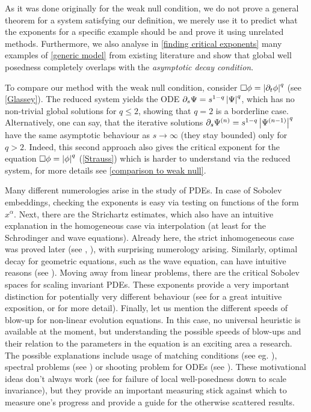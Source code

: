 \documentclass[11pt, oneside]{amsart}
\begin{document}
	As it was done originally for the weak null condition, we do not prove a general  theorem for a system satisfying our definition, we merely use it to predict what the exponents for a specific example should be and prove it using unrelated methods. Furthermore, we also analyse in \cref{finding critical exponents} many examples of \cref{generic model} from existing literature and show that global well posedness completely overlaps with the \textit{asymptotic decay condition}.
	
	To compare our method with the weak null condition, consider $\Box\phi=\left\lvert \partial_t\phi\right\rvert^q$ (see \cref{Glassey}). The reduced system yields the ODE $\partial_s\Psi=s^{1-q}\left\lvert \Psi\right\rvert^q$, which has no non-trivial global solutions for $q\leq2$, showing that $q=2$ is a borderline case. Alternatively, one can say, that the iterative solutions $\partial_s\Psi^{(n)}=s^{1-q}\left\lvert \Psi^{(n-1)}\right\rvert^q$ have the same asymptotic behaviour as $s\to\infty$ (they stay bounded) only for $q>2$. Indeed, this second approach also gives the critical exponent for the equation $\Box\phi=\left\lvert \phi\right\rvert^q$ (\cref{Strauss}) which is harder to understand via the reduced system, for more details see \cref{comparison to weak null}.
	
	\begin{remark}
		Many different numerologies arise in the study of PDEs. In case of Sobolev embeddings, checking the exponents is easy via testing on functions of the form $x^\alpha$. Next, there are the Strichartz estimates, which also have an intuitive explanation in the homogeneous case via interpolation (at least for the Schrodinger and wave equations). Already here, the strict inhomogeneous case was proved later  (see \cite{harmse_lebesgue_1990}, \cite{foschi_inhomogeneous_2005}), with surprising numerology arising. Similarly, optimal decay for geometric equations, such as the wave equation, can have intuitive reasons (see \cite{anderson_global_2021}). Moving away from linear problems, there are the critical Sobolev spaces for scaling invariant PDEs. These exponents provide a very important distinction for potentially very different behaviour (see \cite{tao_low-regularity_2002} for a great intuitive exposition, or \cite{tao_nonlinear_2006} for more detail). Finally, let us mention the different speeds of blow-up for non-linear evolution equations. In this case, no universal heuristic is available at the moment, but understanding the possible speeds of blow-ups and their relation to the parameters in the equation is an exciting area a research. The possible explanations include usage of matching conditions (see eg. \cite{berg_formal_2003}), spectral problems (see \cite{herrero_explosion_1994}) or shooting problem for ODEs (see \cite{merle_blow_2019}).  These motivational ideas don't always work (see \cite{lindblad_sharp_1993} for failure of local well-posedness down to scale invariance), but they provide an important measuring stick against which to measure one's progress and provide a guide for the otherwise scattered results.
	\end{remark}
	
\end{document}
